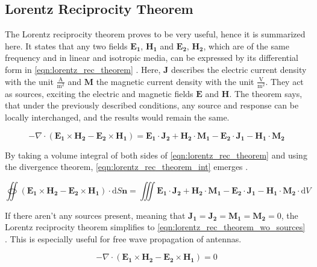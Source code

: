 \subsection{Lorentz Reciprocity Theorem}

The Lorentz reciprocity theorem proves to be very useful, hence it is summarized here. It states that any two fields $\mathbf{E_1}$, $\mathbf{H_1}$ and $\mathbf{E_2}$, $\mathbf{H_2}$, which are of the same frequency and in linear and isotropic media, can be expressed by its differential form in \autoref{eqn:lorentz_rec_theorem} \cite{Balanis_1997}\cite{Collin_2015}. Here, $\mathbf{J}$ describes the electric current density with the unit $\frac{\mathrm{A}}{\mathrm{m^2}}$ and $\mathbf{M}$ the magnetic current density with the unit $\frac{\mathrm{V}}{\mathrm{m^2}}$. They act as sources, exciting the electric and magnetic fields $\mathbf{E}$ and $\mathbf{H}$. The theorem says, that under the previously described conditions, any source and response can be locally interchanged, and the results would remain the same.

\begin{equation}
    -\nabla \cdot (\mathbf{E_1}\times \mathbf{H_2}-\mathbf{E_2}\times \mathbf{H_1})=\mathbf{E_1}\cdot \mathbf{J_2}+\mathbf{H_2}\cdot \mathbf{M_1}-\mathbf{E_2}\cdot \mathbf{J_1}-\mathbf{H_1}\cdot \mathbf{M_2}
    \label{eqn:lorentz_rec_theorem}
\end{equation}

By taking a volume integral of both sides of \autoref{eqn:lorentz_rec_theorem} and using the divergence theorem, \autoref{eqn:lorentz_rec_theorem_int} emerges \cite{Balanis_1997}\cite{Collin_2015}.

\begin{equation}
    \oiint (\mathbf{E_1}\times \mathbf{H_2}-\mathbf{E_2}\times \mathbf{H_1})\cdot \mathrm{d}S\mathbf{n}=\iiint
\mathbf{E_1}\cdot \mathbf{J_2}+\mathbf{H_2}\cdot \mathbf{M_1}-\mathbf{E_2}\cdot \mathbf{J_1}-\mathbf{H_1}\cdot \mathbf{M_2}\cdot \mathrm{d}V
    \label{eqn:lorentz_rec_theorem_int}
\end{equation}

If there aren't any sources present, meaning that $\mathbf{J_1}=\mathbf{J_2}=\mathbf{M_1}=\mathbf{M_2}=0$, the Lorentz reciprocity theorem simplifies to \autoref{eqn:lorentz_rec_theorem_wo_sources} \cite{Balanis_1997}\cite{Lorrain_Corson_1970}. This is especially useful for free wave propagation of antennas.

\begin{equation}
    -\nabla \cdot (\mathbf{E_1}\times \mathbf{H_2}-\mathbf{E_2}\times \mathbf{H_1})=0
    \label{eqn:lorentz_rec_theorem_wo_sources}
\end{equation}

